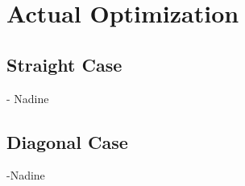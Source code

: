 
\section{Actual Optimization}
\subsection{Straight Case}
- Nadine
\subsection{Diagonal Case}
-Nadine

